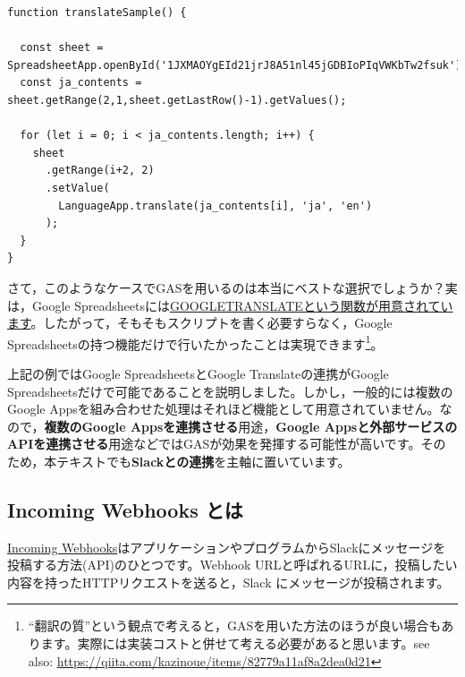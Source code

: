 \documentclass[uplatex,a4j]{jsarticle}
\begin{document}
 \begin{lstlisting}[basicstyle=\ttfamily\footnotesize,frame=single,caption=Translate Script Sample]
function translateSample() {

  const sheet = SpreadsheetApp.openById('1JXMAOYgEId21jrJ8A51nl45jGDBIoPIqVWKbTw2fsuk').getSheetByName('GAS');
  const ja_contents = sheet.getRange(2,1,sheet.getLastRow()-1).getValues();
  
  for (let i = 0; i < ja_contents.length; i++) {
    sheet
      .getRange(i+2, 2)
      .setValue(
        LanguageApp.translate(ja_contents[i], 'ja', 'en')
      );
  }
}
 \end{lstlisting}


さて，このようなケースでGASを用いるのは本当にベストな選択でしょうか？実は，Google Spreadsheetsには\href{https://support.google.com/docs/answer/3093331?hl=ja}{GOOGLETRANSLATEという関数が用意されています}。したがって，そもそもスクリプトを書く必要すらなく，Google Spreadsheetsの持つ機能だけで行いたかったことは実現できます\footnote{``翻訳の質''という観点で考えると，GASを用いた方法のほうが良い場合もあります。実際には実装コストと併せて考える必要があると思います。see also: \href{https://qiita.com/kazinoue/items/82779a11af8a2dea0d21}{https://qiita.com/kazinoue/items/82779a11af8a2dea0d21}}。


上記の例ではGoogle SpreadsheetsとGoogle Translateの連携がGoogle Spreadsheetsだけで可能であることを説明しました。しかし，一般的には複数のGoogle Appsを組み合わせた処理はそれほど機能として用意されていません。なので，\textbf{複数のGoogle Appsを連携させる}用途，\textbf{Google Appsと外部サービスのAPIを連携させる}用途などではGASが効果を発揮する可能性が高いです。そのため，本テキストでも\textbf{Slackとの連携}を主軸に置いています。

\clearpage
\subsection{Incoming Webhooks とは}

\href{https://api.slack.com/messaging/webhooks}{Incoming Webhooks}はアプリケーションやプログラムからSlackにメッセージを投稿する方法(API)のひとつです。Webhook URLと呼ばれるURLに，投稿したい内容を持ったHTTPリクエストを送ると，Slack にメッセージが投稿されます。
\end{document}
